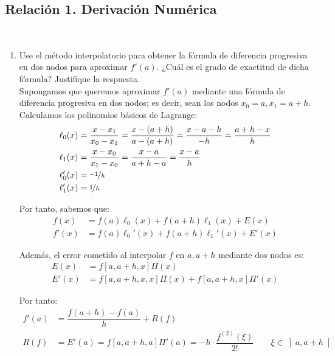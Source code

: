 \subsection{Relación 1. Derivación Numérica}
\setcounter{ejercicio}{0}


\begin{ejercicio}\label{ej:2.1.1}~
    \begin{enumerate}
        \item Use el método interpolatorio para obtener la fórmula de diferencia progresiva en dos nodos para aproximar $f'(a)$. ¿Cuál es el grado de exactitud de dicha fórmula? Justifique la respuesta.\\
        
        Supongamos que queremos aproximar $f'(a)$ mediante una fórmula de diferencia progresiva en dos nodos; es decir, sean los nodos $x_0=a, x_1=a+h$. Calculamos los polinomios básicos de Lagrange:
        \begin{align*}
            \ell_0(x) &= \frac{x - x_1}{x_0 - x_1} = \frac{x - (a+h)}{a - (a+h)} = \frac{x - a - h}{-h} = \frac{a+h-x}{h}\\
            \ell_1(x) &= \frac{x - x_0}{x_1 - x_0} = \frac{x - a}{a+h - a} = \frac{x - a}{h}\\
            \ell_0'(x) &= \nicefrac{-1}{h}\\
            \ell_1'(x) &= \nicefrac{1}{h}
        \end{align*}

        Por tanto, sabemos que:
        \begin{align*}
            f(x) &= f(a)\ell_0(x) + f(a+h)\ell_1(x) + E(x)\\
            f'(x) &= f(a)\ell_0'(x) + f(a+h)\ell_1'(x) + E'(x)
        \end{align*}

        Además, el error cometido al interpolar $f$ en $a, a+h$ mediante dos nodos es:
        \begin{align*}
            E(x) &= f[a, a+h, x]\Pi(x)\\
            E'(x) &= f[a, a+h, x, x]\Pi(x) + f[a, a+h, x]\Pi'(x)
        \end{align*}

        Por tanto:
        \begin{align*}
            f'(a) &= \dfrac{f(a+h) - f(a)}{h} + R(f)\\
            R(f) &= E'(a) = f[a, a+h, a]\Pi'(a) =
            -h\cdot \dfrac{f^{(2)}(\xi)}{2!}\qquad \xi\in\left]a, a+h\right[
        \end{align*}


\end{enumerate}
\end{ejercicio}
